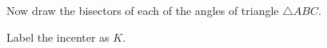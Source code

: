 \documentclass{tufte-handout}
\newcommand{\uv}{\vspace{.1in}}
\newcommand{\uvx}{\vspace{.2in}}
\begin{document}
\begin{tcolorbox}
\uvx
\begin{minipage}{0.5\textwidth}
\end{minipage} \hfill
\begin{minipage}{0.45\textwidth}
\begin{scriptsize}

\uv
Now draw the bisectors of each of the angles of triangle $\triangle ABC.$ 

\uv Label the incenter as $K$.


\end{scriptsize}
\end{minipage}


\end{tcolorbox}
\end{document}
